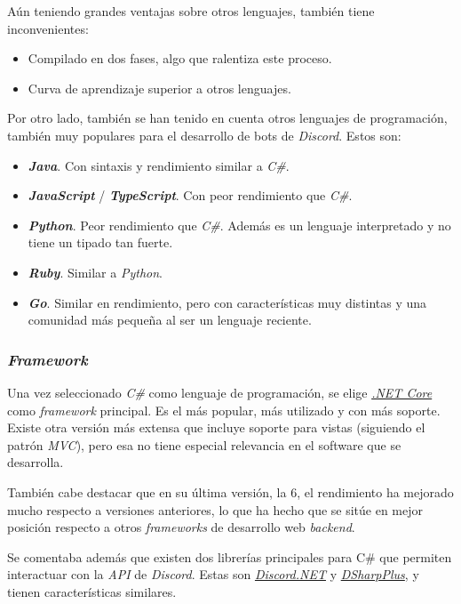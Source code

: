 Aún teniendo grandes ventajas sobre otros lenguajes, también tiene inconvenientes:

\begin{itemize}
	\item Compilado en dos fases, algo que ralentiza este proceso.
	\item Curva de aprendizaje superior a otros lenguajes.
\end{itemize}

Por otro lado, también se han tenido en cuenta otros lenguajes de programación, también muy populares para el desarrollo de bots de \textit{Discord}. Estos son:

\begin{itemize}
	\item \textbf{\textit{Java}}. Con sintaxis y rendimiento similar a \textit{C\#}.
	\item \textbf{\textit{JavaScript}} / \textbf{\textit{TypeScript}}. Con peor rendimiento que \textit{C\#}.
	\item \textbf{\textit{Python}}. Peor rendimiento que \textit{C\#}. Además es un lenguaje interpretado y no tiene un tipado tan fuerte.
	\item \textbf{\textit{Ruby}}. Similar a \textit{\textit{Python}}.
	\item \textbf{\textit{Go}}. Similar en rendimiento, pero con características muy distintas y una comunidad más pequeña al ser un lenguaje reciente.
\end{itemize}

\subsubsection{\textit{Framework}}

Una vez seleccionado \textit{C\#} como lenguaje de programación, se elige \href{https://docs.microsoft.com/es-es/dotnet/}{\textit{.NET Core}} como \textit{framework} principal. Es el más popular, más utilizado y con más soporte. Existe otra versión más extensa que incluye soporte para vistas (siguiendo el patrón \textit{MVC}), pero esa no tiene especial relevancia en el software que se desarrolla.

También cabe destacar que en su última versión, la 6, el rendimiento ha mejorado mucho respecto a versiones anteriores, lo que ha hecho que se sitúe en mejor posición respecto a otros \textit{frameworks} de desarrollo web \textit{backend}.

Se comentaba además que existen dos librerías principales para C\# que permiten interactuar con la \textit{API} de \textit{Discord}. Estas son \href{https://github.com/discord-net/Discord.Net}{\textit{Discord.NET}} y \href{https://github.com/DSharpPlus/DSharpPlus}{\textit{DSharpPlus}}, y tienen características similares.

